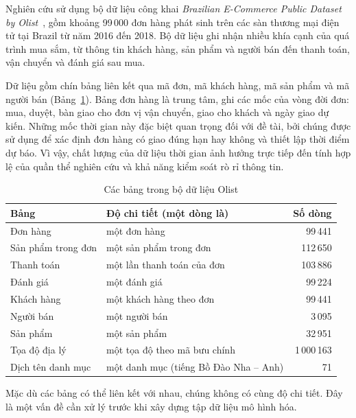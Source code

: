 \documentclass[12pt,a4paper]{report}
\begin{document}
Nghiên cứu sử dụng bộ dữ liệu công khai \emph{Brazilian E-Commerce Public Dataset by Olist}~\cite{olist2018}, gồm khoảng 99\,000 đơn hàng phát sinh trên các sàn thương mại điện tử tại Brazil từ năm 2016 đến 2018. Bộ dữ liệu ghi nhận nhiều khía cạnh của quá trình mua sắm, từ thông tin khách hàng, sản phẩm và người bán đến thanh toán, vận chuyển và đánh giá sau mua.

Dữ liệu gồm chín bảng liên kết qua mã đơn, mã khách hàng, mã sản phẩm và mã người bán (Bảng~\ref{tab:olist}). Bảng đơn hàng là trung tâm, ghi các mốc của vòng đời đơn: mua, duyệt, bàn giao cho đơn vị vận chuyển, giao cho khách và ngày giao dự kiến. Những mốc thời gian này đặc biệt quan trọng đối với đề tài, bởi chúng được sử dụng để xác định đơn hàng có giao đúng hạn hay không và thiết lập thời điểm dự báo. Vì vậy, chất lượng của dữ liệu thời gian ảnh hưởng trực tiếp đến tính hợp lệ của quần thể nghiên cứu và khả năng kiểm soát rò rỉ thông tin.

\begin{table}[htbp]\centering\small
\caption{Các bảng trong bộ dữ liệu Olist}\label{tab:olist}
\begin{tabular}{llr}
\toprule
Bảng & Độ chi tiết (một dòng là) & Số dòng \\
\midrule
Đơn hàng                 & một đơn hàng                          &    99\,441 \\
Sản phẩm trong đơn       & một sản phẩm trong đơn                &   112\,650 \\
Thanh toán               & một lần thanh toán của đơn            &   103\,886 \\
Đánh giá                 & một đánh giá                          &    99\,224 \\
Khách hàng               & một khách hàng theo đơn               &    99\,441 \\
Người bán                & một người bán                         &     3\,095 \\
Sản phẩm                 & một sản phẩm                          &    32\,951 \\
Tọa độ địa lý            & một tọa độ theo mã bưu chính          & 1\,000\,163 \\
Dịch tên danh mục        & một danh mục (tiếng Bồ Đào Nha -- Anh) & 71 \\
\bottomrule
\end{tabular}
\end{table}

Mặc dù các bảng có thể liên kết với nhau, chúng không có cùng độ chi tiết. Đây là một vấn đề cần xử lý trước khi xây dựng tập dữ liệu mô hình hóa.
\end{document}

